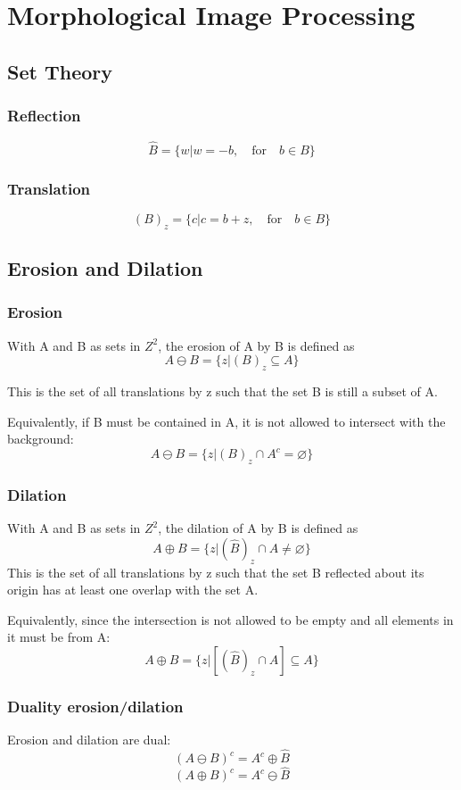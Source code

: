 \section{Morphological Image Processing}

\subsection{Set Theory}
\begin{multicols}{2}
\subsubsection{Reflection}
\[
	\hat{B} = \{w | w = -b,\quad \text{for} \quad b \in B \}
\]


\subsubsection{Translation}
\[
	(B)_z = \{ c | c = b + z,\quad \text{for} \quad b \in B\}
\]

\subsection{Erosion and Dilation}
\subsubsection{Erosion}
With A and B as sets in $Z^2$, the erosion of A by B is defined as
\[
	A \ominus B = \{z|(B)_z \subseteq A  \}
\]

This is the set of all translations by z such that the set B is still a subset of A.

Equivalently, if B must be contained in A, it is not allowed to intersect with the background:
\[
	A \ominus B = \{z|(B)_z \cap A^c = \varnothing  \}
\]


\subsubsection{Dilation}
With A and B as sets in $Z^2$, the dilation of A by B is defined as
\[
	A \oplus B = \{z |(\hat{B})_z \cap A \neq \varnothing \}
\]
This is the set of all translations by z such that the set B reflected about its origin has at least one overlap with the set A.

Equivalently, since the intersection is not allowed to be empty and all elements in it must be from A:
\[
	A \oplus B = \{z | [(\hat{B})_z \cap A] \subseteq A \}
\]


\subsubsection{Duality erosion/dilation}
Erosion and dilation are dual:
\[
	(A  \ominus B)^c = A^c \oplus \hat{B}
\]
\[
	(A \oplus B)^c = A^c \ominus \hat{B}
\]

\end{multicols}
